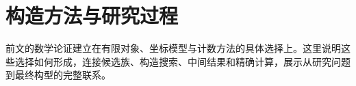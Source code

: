 \section{构造方法与研究过程}

前文的数学论证建立在有限对象、坐标模型与计数方法的具体选择上。这里说明这些选择如何形成，连接候选族、构造搜索、中间结果和精确计算，展示从研究问题到最终构型的完整联系。




